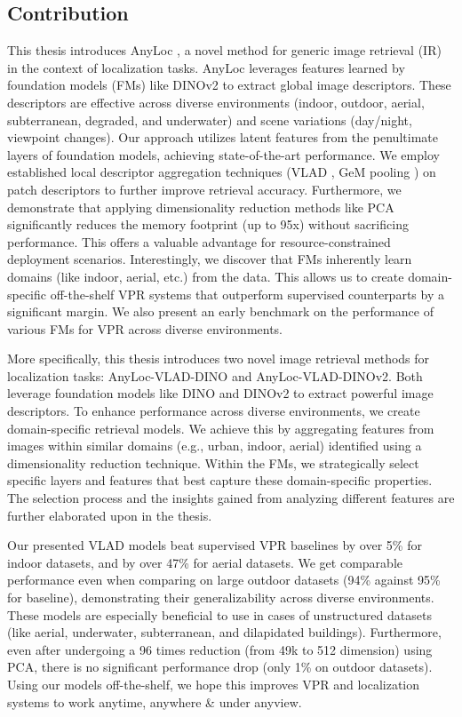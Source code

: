 \documentclass{article}
\begin{document}
    \subsection*{Contribution}
    This thesis introduces AnyLoc \cite{Keetha2023AnyLocTU}, a novel
    method for generic image retrieval (IR) in the context of
    localization tasks. AnyLoc leverages features learned by
    foundation models (FMs) like DINOv2 \cite{Oquab2023DINOv2LR} to
    extract global image descriptors. These descriptors are effective
    across diverse environments (indoor, outdoor, aerial,
    subterranean, degraded, and underwater) and scene variations
    (day/night, viewpoint changes). Our approach utilizes latent
    features from the penultimate layers of foundation models,
    achieving state-of-the-art performance. We employ established
    local descriptor aggregation techniques (VLAD
    \cite{Arandjelovi2013AllAV}, GeM pooling
    \cite{Radenovic2017FineTuningCI}) on patch descriptors to further
    improve retrieval accuracy. Furthermore, we demonstrate that
    applying dimensionality reduction methods like PCA significantly
    reduces the memory footprint (up to 95x) without sacrificing
    performance. This offers a valuable advantage for
    resource-constrained deployment scenarios. Interestingly, we
    discover that FMs inherently learn domains (like indoor, aerial,
    etc.) from the data. This allows us to create domain-specific
    off-the-shelf VPR systems that outperform supervised counterparts
    by a significant margin. We also present an early benchmark on the
    performance of various FMs for VPR across diverse environments.

    More specifically, this thesis introduces two novel image
    retrieval methods for localization tasks: AnyLoc-VLAD-DINO and
    AnyLoc-VLAD-DINOv2. Both leverage foundation models like DINO and
    DINOv2 to extract powerful image descriptors. To enhance
    performance across diverse environments, we create domain-specific
    retrieval models. We achieve this by aggregating features from
    images within similar domains (e.g., urban, indoor, aerial)
    identified using a dimensionality reduction technique. Within the
    FMs, we strategically select specific layers and features that
    best capture these domain-specific properties. The selection
    process and the insights gained from analyzing different features
    are further elaborated upon in the thesis.

    Our presented VLAD models beat supervised VPR baselines by over
    5\% for indoor datasets, and by over 47\% for aerial datasets. We
    get comparable performance even when comparing on large outdoor
    datasets (94\% against 95\% for baseline), demonstrating their
    generalizability across diverse environments. These models are
    especially beneficial to use in cases of unstructured datasets
    (like aerial, underwater, subterranean, and dilapidated
    buildings). Furthermore, even after undergoing a 96 times
    reduction (from 49k to 512 dimension) using PCA, there is no
    significant performance drop (only 1\% on outdoor datasets). Using
    our models off-the-shelf, we hope this improves VPR and
    localization systems to work anytime, anywhere \& under anyview.
\end{document}
